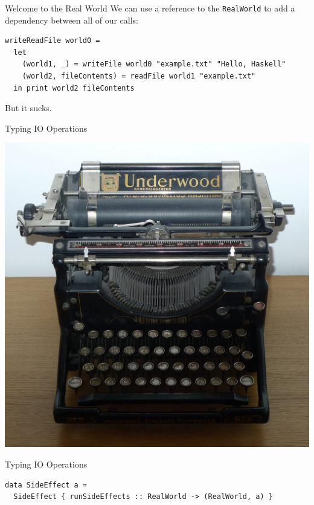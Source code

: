 \documentclass[10pt, presentation, colorlinks]{beamer}
\begin{document}
\begin{frame}[label={sec:org9e27d21},fragile]{Welcome to the Real World}
 We can use a reference to the \texttt{RealWorld} to add a dependency between all of our calls:

\bigskip
\pause

\begin{verbatim}
writeReadFile world0 =
  let
    (world1, _) = writeFile world0 "example.txt" "Hello, Haskell"
    (world2, fileContents) = readFile world1 "example.txt"
  in print world2 fileContents
\end{verbatim}

\bigskip
\pause

But it sucks.
\end{frame}

\begin{frame}[label={sec:org7681b52}]{Typing IO Operations}
\begin{center}
\includegraphics[height=0.4\textheight]{./img/typewriter.JPG}
\end{center}
\end{frame}

\begin{frame}[label={sec:org5aef993},fragile]{Typing IO Operations}
 \begin{verbatim}
data SideEffect a =
  SideEffect { runSideEffects :: RealWorld -> (RealWorld, a) }
\end{verbatim}
\end{frame}
\end{document}
